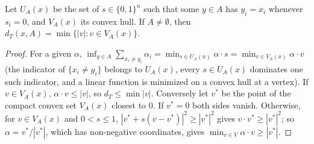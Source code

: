 \begin{lemma}\label{lem:dtgeom}
Let $U_A(x)$ be the set of $s\in\{0,1\}^n$ such that some $y\in A$ has $y_i=x_i$ whenever $s_i=0$, and $V_A(x)$ its convex hull. If $A\ne\emptyset$, then
$d_T(x,A)=\min\{|v|:v\in V_A(x)\}$.
\end{lemma}
\begin{proof}
For a given $\alpha$, $\inf_{y\in A}\sum_{x_i\ne y_i}\alpha_i=\min_{s\in U_A(x)}\alpha\cdot s=\min_{v\in V_A(x)}\alpha\cdot v$ (the indicator of $\{x_i\ne y_i\}$ belongs to $U_A(x)$, every $s\in U_A(x)$ dominates one
such indicator, and a linear function is minimized on a convex hull at a vertex). If $v\in V_A(x)$, $\alpha\cdot v\le|v|$, so $d_T\le\min|v|$. Conversely let $v^*$ be the point of the compact
convex set $V_A(x)$ closest to $0$. If $v^*=0$ both sides vanish. Otherwise, for $v\in V_A(x)$ and $0<s\le1$, $|v^*+s(v-v^*)|^2\ge|v^*|^2$ gives $v\cdot v^*\ge|v^*|^2$;
so $\alpha=v^*/|v^*|$, which has non-negative coordinates, gives $\min_{v\in V}\alpha\cdot v\ge|v^*|$.
\end{proof}

